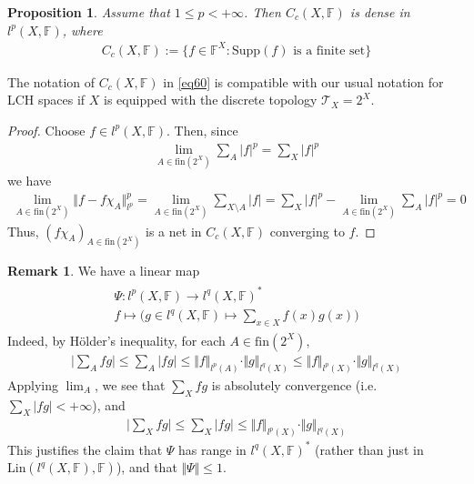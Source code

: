 \documentclass[12pt,b5paper,notitlepage]{article}
\theoremstyle{definition}
\newtheorem{rem}[df]{Remark}
\theoremstyle{plain}
\newtheorem{pp}[df]{Proposition}
\newcommand{\mc}{\mathcal}
\newcommand{\fin}{\mathrm{fin}}
\newcommand{\Supp}{\mathrm{Supp}}
\newcommand{\Fbb}{\mathbb F}
\newcommand{\Lin}{\mathrm{Lin}}
\numberwithin{equation}{section}
\begin{document}
\begin{pp}\label{lb109}
Assume that $1\leq p<+\infty$. Then $C_c(X,\Fbb)$ is dense in $l^p(X,\Fbb)$, where
\begin{align}\label{eq60}
C_c(X,\Fbb):=\{f\in\Fbb^X:\Supp(f)\text{ is a finite set}\}
\end{align}
\end{pp}

The notation of $C_c(X,\Fbb)$ in \eqref{eq60} is compatible with our usual notation for LCH spaces if $X$ is equipped with the discrete topology $\mc T_X=2^X$.

\begin{proof}
Choose $f\in l^p(X,\Fbb)$. Then, since
\begin{align*}
\lim_{A\in\fin(2^X)}\sum_A|f|^p=\sum_X|f|^p
\end{align*}
we have
\begin{align*}
\lim_{A\in\fin(2^X)} \Vert f-f\chi_A\Vert_{l^p}^p=\lim_{A\in\fin(2^X)}\sum_{X\setminus A}|f|=\sum_X|f|^p-\lim_{A\in\fin(2^X)}\sum_A|f|^p=0
\end{align*}
Thus, $(f\chi_A)_{A\in\fin(2^X)}$ is a net in $C_c(X,\Fbb)$ converging to $f$.
\end{proof}




\begin{rem}\label{lb108}
We have a linear map
\begin{gather}\label{eq58}
\begin{gathered}
\Psi:l^p(X,\Fbb)\rightarrow l^q(X,\Fbb)^*\\
f\mapsto\Big(g\in l^q(X,\Fbb)\mapsto \sum_{x\in X}f(x)g(x)\Big)
\end{gathered}
\end{gather}
Indeed, by H\"older's inequality, for each $A\in\fin(2^X)$,
\begin{align*}
\Big|\sum_A fg\Big|\leq\sum_A|fg|\leq \Vert f\Vert_{l^p(A)}\cdot\Vert g\Vert_{l^q(X)}\leq \Vert f\Vert_{l^p(X)}\cdot\Vert g\Vert_{l^q(X)}
\end{align*}
Applying $\lim_A$, we see that $\sum_Xfg$ is absolutely convergence (i.e. $\sum_X|fg|<+\infty$), and 
\begin{align*}
\Big|\sum_X fg\Big|\leq\sum_X|fg|\leq\Vert f\Vert_{l^p(X)}\cdot\Vert g\Vert_{l^q(X)}
\end{align*}
This justifies the claim that $\Psi$ has range in $l^q(X,\Fbb)^*$ (rather than just in $\Lin(l^q(X,\Fbb),\Fbb)$), and that $\Vert\Psi\Vert\leq 1$.
\end{rem}
\end{document}
